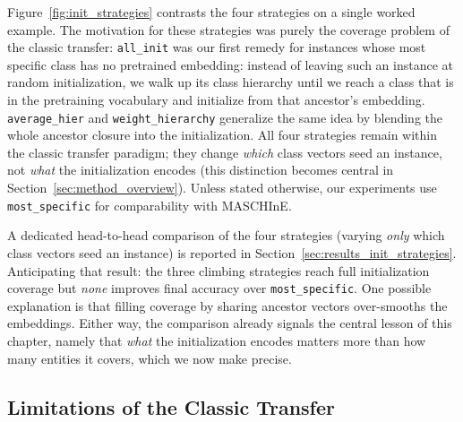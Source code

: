 \documentclass[a4paper,oneside,bibliography=totoc]{scrbook}
\begin{document}
Figure~\ref{fig:init_strategies} contrasts the four strategies on a single
worked example. The motivation for these strategies was purely the coverage problem of the
classic transfer: \texttt{all\_init} was our first remedy for instances whose
most specific class has no pretrained embedding: instead of leaving such an
instance at random initialization, we walk up its class hierarchy until we
reach a class that is in the pretraining vocabulary and initialize from that
ancestor's embedding. \texttt{average\_hier} and \texttt{weight\_hierarchy}
generalize the same idea by blending the whole ancestor closure into the
initialization. All four strategies remain within the classic transfer
paradigm; they change \emph{which} class vectors seed an instance, not
\emph{what} the initialization encodes (this distinction becomes central in
Section~\ref{sec:method_overview}). Unless stated otherwise, our experiments
use \texttt{most\_specific} for comparability with MASCHInE.

A dedicated head-to-head comparison of the four strategies (varying \emph{only}
which class vectors seed an instance) is reported in
Section~\ref{sec:results_init_strategies}. Anticipating that result: the three
climbing strategies reach full initialization coverage but \emph{none} improves
final accuracy over \texttt{most\_specific}. One possible explanation is that
filling coverage by sharing ancestor vectors over-smooths the embeddings. Either way, the comparison already signals
the central lesson of this chapter, namely that \emph{what} the initialization
encodes matters more than how many entities it covers, which we now make precise.

\subsection{Limitations of the Classic Transfer}
\label{sec:classic_limits}
\end{document}
